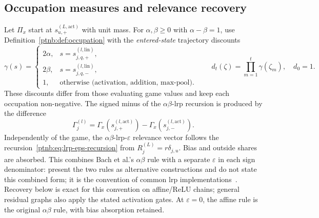 \subsection{Occupation measures and relevance recovery}\label{ptnb:app:routing-attribution}

Let $\Pi_x$ start at $s_{u,+}^{(L,\mathrm{act})}$ with unit mass. For $\alpha,\beta\geq0$ with $\alpha-\beta=1$, use Definition~\ref{ptnb:def:occupation} with the \emph{entered-state} trajectory discounts
\begin{equation}\label{ptnb:eq:routing-edge-discount}
 \gamma(s)=\begin{cases}
 2\alpha,&s=s_{j,q,+}^{(l,\mathrm{lin})},\\
 2\beta,&s=s_{j,q,-}^{(l,\mathrm{lin})},\\
 1,&\text{otherwise (activation, addition, max-pool).}
 \end{cases}
 \qquad
 d_t(\zeta)=\prod_{m=1}^t\gamma(\zeta_m),\quad d_0=1.
\end{equation}
These discounts differ from those evaluating game values and keep each occupation non-negative. The signed minus of the $\alpha\beta$-\ac{lrp} recursion is produced by the difference
\begin{equation}\label{ptnb:eq:routing-Gamma-pair}
 \Gamma_j^{(l)}=\Gamma_x(s_{j,+}^{(l,\mathrm{act})})-\Gamma_x(s_{j,-}^{(l,\mathrm{act})}).
\end{equation}
Independently of the game, the $\alpha\beta$-\ac{lrp}-$\varepsilon$ relevance vector follows the recursion~\eqref{ptnb:eq:lrp-eps-recursion} from $R_j^{(L)}=r\delta_{j,u}$. Bias and outside shares are absorbed. This combines Bach et al.'s $\alpha\beta$ rule with a separate $\varepsilon$ in each sign denominator: \textcite{Bach2015} present the two rules as alternative constructions and do not state this combined form; it is the convention of common \ac{lrp} implementations~\parencite{Anders2021Zennit}. Recovery below is exact for this convention on affine/ReLU chains; general residual graphs also apply the stated activation gates. At $\varepsilon=0$, the affine rule is the original $\alpha\beta$ rule, with bias absorption retained.

